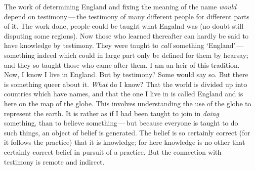   The work of determining England and fixing the meaning of the name \emph{would} depend on testimony\,---\,the testimony of many different people for different parts of it. The work done, people could be taught what Engalnd was (no doubt still disputing some regions). Now those who learned thereafter can hardly be said to have knowledge by testimony. They were taught to \emph{call} something `England'\,---\,something indeed which could in large part only be defined for them by hearsay; and they so taught those who came after them. I am an heir of this tradition. Now, I know I live in England. But by testimony? Some would say so. But there is something queer about it. \emph{What} do I know? That the world is divided up into countries which have names, and that the one I live in is called England and is here on the map of the globe. This involves understanding the use of the globe to represent the earth. It is rather as if I had been taught to join in \emph{doing} something, than to believe something\,---\,but because everyone is taught to do such things, an object of belief is generated. The belief is so certainly correct (for it follows the practice) that it is knowledge; for here knowledge is no other that certainly correct belief in pursuit of a practice. But the connection with testimony is remote and indirect.
